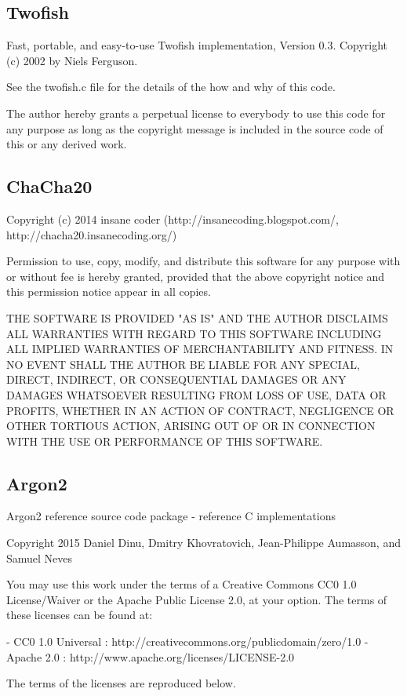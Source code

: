 \documentclass[parskip=half]{scrartcl}
\begin{document}
\subsection{Twofish}
Fast, portable, and easy-to-use Twofish implementation,
Version 0.3.
Copyright (c) 2002 by Niels Ferguson.
 
See the twofish.c file for the details of the how and why of this code.
 
The author hereby grants a perpetual license to everybody to
use this code for any purpose as long as the copyright message is included
in the source code of this or any derived work.

\subsection{ChaCha20}
Copyright (c) 2014 insane coder (http://insanecoding.blogspot.com/, http://chacha20.insanecoding.org/)

Permission to use, copy, modify, and distribute this software for any
purpose with or without fee is hereby granted, provided that the above
copyright notice and this permission notice appear in all copies.

THE SOFTWARE IS PROVIDED "AS IS" AND THE AUTHOR DISCLAIMS ALL WARRANTIES
WITH REGARD TO THIS SOFTWARE INCLUDING ALL IMPLIED WARRANTIES OF
MERCHANTABILITY AND FITNESS. IN NO EVENT SHALL THE AUTHOR BE LIABLE FOR
ANY SPECIAL, DIRECT, INDIRECT, OR CONSEQUENTIAL DAMAGES OR ANY DAMAGES
WHATSOEVER RESULTING FROM LOSS OF USE, DATA OR PROFITS, WHETHER IN AN
ACTION OF CONTRACT, NEGLIGENCE OR OTHER TORTIOUS ACTION, ARISING OUT OF
OR IN CONNECTION WITH THE USE OR PERFORMANCE OF THIS SOFTWARE.

\subsection{Argon2}
Argon2 reference source code package - reference C implementations

Copyright 2015
Daniel Dinu, Dmitry Khovratovich, Jean-Philippe Aumasson, and Samuel Neves

You may use this work under the terms of a Creative Commons CC0 1.0 
License/Waiver or the Apache Public License 2.0, at your option. The terms of
these licenses can be found at:

- CC0 1.0 Universal : http://creativecommons.org/publicdomain/zero/1.0
- Apache 2.0        : http://www.apache.org/licenses/LICENSE-2.0

The terms of the licenses are reproduced below.
\end{document}
